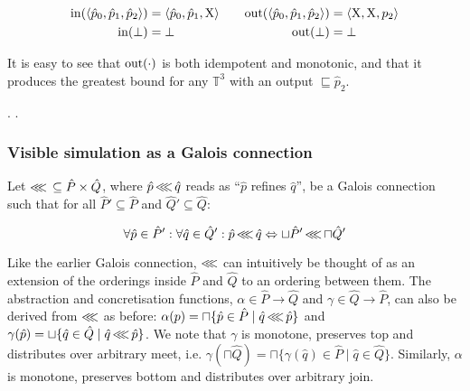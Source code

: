
\begin{equation*}
\begin{aligned}[t]
\operatorname{in}(\langle \hat p_{0}, \hat p_{1}, \hat p_{2} \rangle) &= \langle \hat p_{0}, \hat p_{1}, \mathrm{X} \rangle \\
\operatorname{in}(\bot) &= \bot
\end{aligned}
\qquad
\begin{aligned}[t]
\operatorname{out}(\langle \hat p_{0}, \hat p_{1}, \hat p_{2} \rangle) &= \langle \mathrm{X}, \mathrm{X}, p_{2} \rangle \\
\operatorname{out}(\bot) &= \bot
\end{aligned}
\end{equation*}

\noindent It is easy to see that $\operatorname{out}(\cdot)$ is both idempotent and monotonic, and that it produces the greatest bound for any $\mathbb{T}^{3}$ with an output $\sqsubseteq \hat p_{2}$.

. .


\subsubsection{Visible simulation as a Galois connection}

Let $\operatorname{\lll} \, \subseteq \hat P \times \hat Q$, where $\hat p \operatorname{\lll} \hat q$ reads as ``$\hat p$ refines $\hat q$'', be a Galois connection such that for all $\hat P' \subseteq \hat P$ and $\hat Q' \subseteq \hat Q$:

\begin{equation*}
\forall \hat p \in \hat P' : \forall \hat q \in \hat Q' : \hat p \operatorname{\lll} \hat q \Leftrightarrow \sqcup \hat P' \operatorname{\lll} \sqcap \hat Q'
\end{equation*}

\noindent Like the earlier Galois connection, $\operatorname{\lll}$ can intuitively be thought of as an extension of the orderings inside $\hat P$ and $\hat Q$ to an ordering between them. The abstraction and concretisation functions, $\alpha \in \hat P \rightarrow \hat Q$ and $\gamma \in \hat Q \rightarrow \hat P$, can also be derived from $\operatorname{\lll}$ as before: $\alpha(p) = \sqcap \{ \hat p \in \hat P \mid \hat q \operatorname{\lll} \hat p \}$ and $\gamma(\hat p) = \sqcup \{ \hat q \in \hat Q \mid \hat q \operatorname{\lll} \hat p \}$. We note that $\gamma$ is monotone, preserves top and distributes over arbitrary meet, i.e. $\gamma(\sqcap \hat Q) = \sqcap \{ \gamma(\hat q) \in \hat P \mid \hat q \in \hat Q\}$. Similarly, $\alpha$ is monotone, preserves bottom and distributes over arbitrary join.

